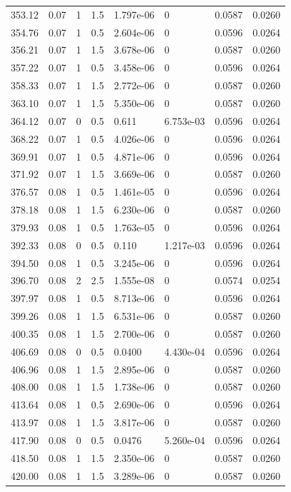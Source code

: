 \documentclass[preview]{standalone}
\begin{document}
{{{\begin{tabular}{L{1.2cm}C{1.2cm} C{0.3cm}C{0.5cm} C{1.4cm}C{1.4cm} C{1.4cm}C{1.4cm}}
  353.12  &  0.07  & 1     & 1.5 &  1.797e-06  & 0  & 0.0587 &  0.0260   \\ 
  354.76  &  0.07  & 1     & 0.5 &  2.604e-06  & 0  & 0.0596 &  0.0264   \\ 
  356.21  &  0.07  & 1     & 1.5 &  3.678e-06  & 0  & 0.0587 &  0.0260   \\ 
  357.22  &  0.07  & 1     & 0.5 &  3.458e-06  & 0  & 0.0596 &  0.0264   \\ 
  358.33  &  0.07  & 1     & 1.5 &  2.772e-06  & 0  & 0.0587 &  0.0260   \\ 
  363.10  &  0.07  & 1     & 1.5 &  5.350e-06  & 0  & 0.0587 &  0.0260   \\ 
  364.12  &  0.07  & 0     & 0.5 &  0.611  & 6.753e-03  & 0.0596 &  0.0264   \\ 
  368.22  &  0.07  & 1     & 0.5 &  4.026e-06  & 0  & 0.0596 &  0.0264   \\ 
  369.91  &  0.07  & 1     & 0.5 &  4.871e-06  & 0  & 0.0596 &  0.0264   \\ 
  371.92  &  0.07  & 1     & 1.5 &  3.669e-06  & 0  & 0.0587 &  0.0260   \\ 
  376.57  &  0.08  & 1     & 0.5 &  1.461e-05  & 0  & 0.0596 &  0.0264   \\ 
  378.18  &  0.08  & 1     & 1.5 &  6.230e-06  & 0  & 0.0587 &  0.0260   \\ 
  379.93  &  0.08  & 1     & 0.5 &  1.763e-05  & 0  & 0.0596 &  0.0264   \\ 
  392.33  &  0.08  & 0     & 0.5 &  0.110  & 1.217e-03  & 0.0596 &  0.0264   \\ 
  394.50  &  0.08  & 1     & 0.5 &  3.245e-06  & 0  & 0.0596 &  0.0264   \\ 
  396.70  &  0.08  & 2     & 2.5 &  1.555e-08  & 0  & 0.0574 &  0.0254   \\ 
  397.97  &  0.08  & 1     & 0.5 &  8.713e-06  & 0  & 0.0596 &  0.0264   \\ 
  399.26  &  0.08  & 1     & 1.5 &  6.531e-06  & 0  & 0.0587 &  0.0260   \\ 
  400.35  &  0.08  & 1     & 1.5 &  2.700e-06  & 0  & 0.0587 &  0.0260   \\ 
  406.69  &  0.08  & 0     & 0.5 &  0.0400  & 4.430e-04  & 0.0596 &  0.0264   \\ 
  406.96  &  0.08  & 1     & 1.5 &  2.895e-06  & 0  & 0.0587 &  0.0260   \\ 
  408.00  &  0.08  & 1     & 1.5 &  1.738e-06  & 0  & 0.0587 &  0.0260   \\ 
  413.64  &  0.08  & 1     & 0.5 &  2.690e-06  & 0  & 0.0596 &  0.0264   \\ 
  413.97  &  0.08  & 1     & 1.5 &  3.817e-06  & 0  & 0.0587 &  0.0260   \\ 
  417.90  &  0.08  & 0     & 0.5 &  0.0476  & 5.260e-04  & 0.0596 &  0.0264   \\ 
  418.50  &  0.08  & 1     & 1.5 &  2.350e-06  & 0  & 0.0587 &  0.0260   \\ 
  420.00  &  0.08  & 1     & 1.5 &  3.289e-06  & 0  & 0.0587 &  0.0260   \\ 
\hline 
\end{tabular} 

}}}
\end{document}
